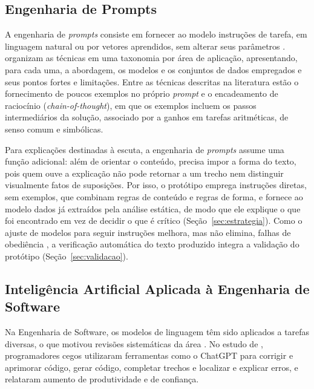 \documentclass[
    12pt,                   %
    openright,              %
    oneside,                %
    a4paper,                %
    sumario=tradicional,    %
    english,                %
    brazil,                 %
    ]{abntex2}
\begin{document}
\subsection{Engenharia de Prompts}\label{sec:prompts}

A engenharia de \textit{prompts} consiste em fornecer ao modelo instruções de tarefa, em linguagem natural ou por vetores aprendidos, sem alterar seus parâmetros \cite{sahoo2024prompt}. \textcite{sahoo2024prompt} organizam as técnicas em uma taxonomia por área de aplicação, apresentando, para cada uma, a abordagem, os modelos e os conjuntos de dados empregados e seus pontos fortes e limitações. Entre as técnicas descritas na literatura estão o fornecimento de poucos exemplos no próprio \textit{prompt} \cite{brown2020fewshot} e o encadeamento de raciocínio (\textit{chain-of-thought}), em que os exemplos incluem os passos intermediários da solução, associado por \textcite{wei2022cot} a ganhos em tarefas aritméticas, de senso comum e simbólicas.

Para explicações destinadas à escuta, a engenharia de \textit{prompts} assume uma função adicional: além de orientar o conteúdo, precisa impor a forma do texto, pois quem ouve a explicação não pode retornar a um trecho nem distinguir visualmente fatos de suposições. Por isso, o protótipo emprega instruções diretas, sem exemplos, que combinam regras de conteúdo e regras de forma, e fornece ao modelo dados já extraídos pela análise estática, de modo que ele explique o que foi encontrado em vez de decidir o que é crítico (Seção~\ref{sec:estrategia}). Como o ajuste de modelos para seguir instruções melhora, mas não elimina, falhas de obediência \cite{ouyang2022instructions}, a verificação automática do texto produzido integra a validação do protótipo (Seção~\ref{sec:validacao}).

\subsection{Inteligência Artificial Aplicada à Engenharia de Software}\label{sec:IAES}

Na Engenharia de Software, os modelos de linguagem têm sido aplicados a tarefas diversas, o que motivou revisões sistemáticas da área \cite{hou2024llmse}. No estudo de \textcite{latinoware34224}, programadores cegos utilizaram ferramentas como o ChatGPT para corrigir e aprimorar código, gerar código, completar trechos e localizar e explicar erros, e relataram aumento de produtividade e de confiança.
\end{document}
